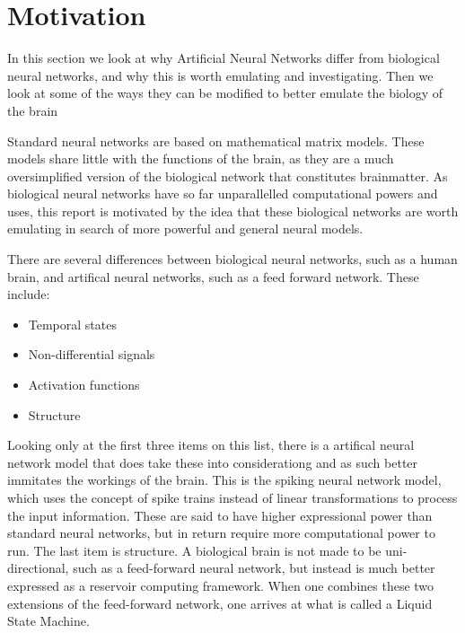 \section{Motivation}

In this section we look at why Artificial Neural Networks differ from biological neural networks, and why this is worth emulating and investigating. Then we look at some of the ways they can be modified to better emulate the biology of the brain

Standard neural networks are based on mathematical matrix models. These models share little with the functions of the brain, as they are a much oversimplified version of the biological network that constitutes brainmatter.
As biological neural networks have so far unparallelled computational powers and uses, this report is motivated by the idea that these biological networks are worth emulating in search of more powerful and general neural models.

There are several differences between biological neural networks, such as a human brain, and artifical neural networks, such as a feed forward network. These include:

\begin{itemize}
\item Temporal states
\item Non-differential signals
\item Activation functions
\item Structure
\end{itemize}

Looking only at the first three items on this list, there is a artifical neural network model that does take these into considerationg and as such better immitates the workings of the brain. This is the spiking neural network model, which uses the concept of spike trains instead of linear transformations to process the input information. These are said to have higher expressional power than standard neural networks, but in return require more computational power to run.
The last item is structure. A biological brain is not made to be uni-directional, such as a feed-forward neural network, but instead is much better expressed as a reservoir computing framework. When one combines these two extensions of the feed-forward network, one arrives at what is called a Liquid State Machine.